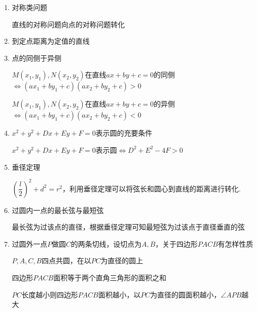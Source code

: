 \begin{enumerate}
\begin{jieda}
        判断采用法向量（方向向量）求解还是采用斜率求解
    \end{jieda}
    \item 对称类问题
    \begin{jieda}
        直线的对称问题向点的对称问题转化
    \end{jieda}
    \item 到定点距离为定值的直线
    \begin{jieda}
    \end{jieda}
    \item 点的同侧于异侧
    \begin{jieda}
        $M(x_1, y_1), N(x_2, y_2)$在直线$ax+by+c=0$的同侧$\Longleftrightarrow (ax_1+by_1+c)(ax_2+by_2+c)>0$
        
        $M(x_1, y_1), N(x_2, y_2)$在直线$ax+by+c=0$的异侧$\Longleftrightarrow (ax_1+by_1+c)(ax_2+by_2+c)<0$
    \end{jieda}
    \item $x^2+y^2+Dx+Ey+F = 0$表示圆的充要条件
    \begin{jieda}
        $x^2+y^2+Dx+Ey+F = 0$表示圆$\Longleftrightarrow D^2+E^2-4F > 0$
    \end{jieda}
    \item 垂径定理
    \begin{jieda}
        $\left(\dfrac{l}{2}\right)^2 + d^2 = r^2$，利用垂径定理可以将弦长和圆心到直线的距离进行转化.
    \end{jieda}
    \item 过圆内一点的最长弦与最短弦
    \begin{jieda}
        最长弦为过该点的直径，根据垂径定理可知最短弦为过该点于直径垂直的弦
    \end{jieda}

    \item 过圆外一点$P$做圆$C$的两条切线，设切点为$A,B$，关于四边形$PACB$有怎样性质
    \begin{jieda}
        $P,A,C,B$四点共圆，在以$PC$为直径的圆上

        四边形$PACB$面积等于两个直角三角形的面积之和

        $PC$长度越小则四边形$PACB$面积越小，以$PC$为直径的圆面积越小，$\angle APB$越大
    \end{jieda}


\end{enumerate}
